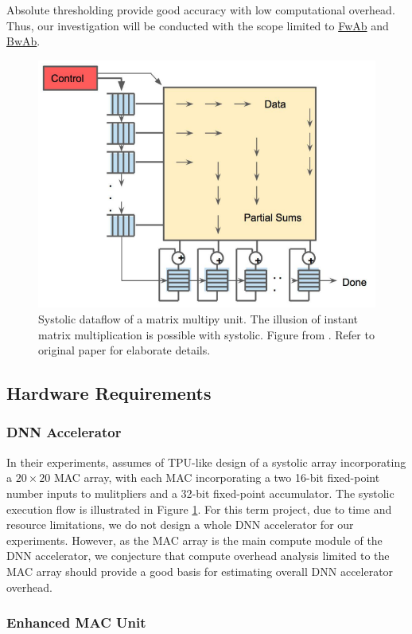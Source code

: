\documentclass[11pt]{article}
\begin{document}
Absolute thresholding provide good accuracy with low computational overhead. Thus, our investigation will be conducted with the scope limited to \underline{FwAb} and \underline{BwAb}.

\begin{figure}[H]
    \begin{center}
    \includegraphics[width=.4\linewidth]{images/systolic-mac.png}
    \end{center}
    \caption{Systolic dataflow of a matrix multipy unit. The illusion of instant matrix multiplication is possible with systolic. Figure from \cite{tpu}. Refer to original paper for elaborate details.}
        \label{fig:tpu}
\end{figure}

\subsection{Hardware Requirements\label{sec:mac}}

\subsubsection{DNN Accelerator}

In their experiments, \citeauthor{ptolemy} assumes of TPU-like design of a systolic array \cite{tpu} incorporating a $20\times20$ MAC array, with each MAC incorporating a two 16-bit fixed-point number inputs to mulitpliers and a 32-bit fixed-point accumulator. The systolic execution flow is illustrated in Figure \ref{fig:tpu}. For this term project, due to time and resource limitations, we do not design a whole DNN accelerator for our experiments. However, as the MAC array is the main compute module of the DNN accelerator, we conjecture that compute overhead analysis limited to the MAC array should provide a good basis for estimating overall DNN accelerator overhead.

\subsubsection{Enhanced MAC Unit}
\end{document}
